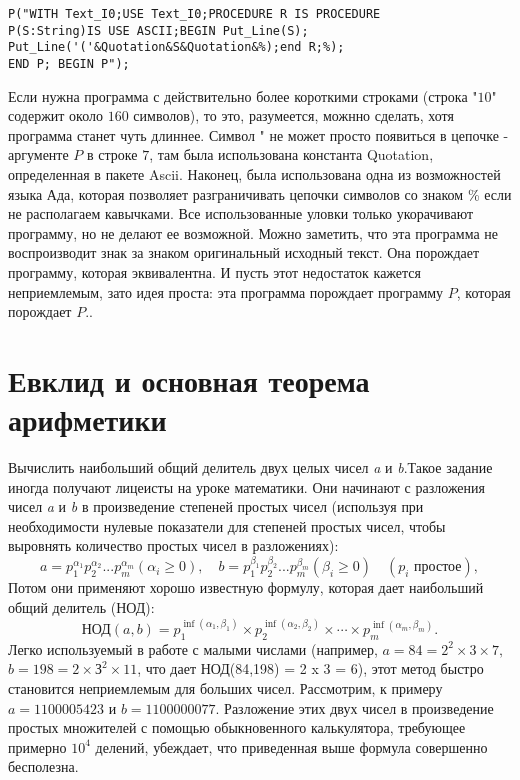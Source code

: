 \begin{lstlisting}[frame=none, mathescape=true, showstringspaces=false]
	P("WITH Text_I0;USE Text_I0;PROCEDURE R IS PROCEDURE
P(S:String)IS USE ASCII;BEGIN Put_Line(S);
Put_Line('('&Quotation&S&Quotation&%);end R;%);
END P; BEGIN P");
\end{lstlisting}

Если нужна программа с действительно более короткими строками \linebreak (строка "$10$" содержит около $160$ символов), то это, разумеется, можнно сделать, хотя программа станет чуть длиннее. Символ " не может просто появиться в цепочке - аргументе $P$ в строке $7$, там была использована константа Quotation, определенная в пакете Ascii. Наконец, была использована одна из возможностей языка Ада, которая позволяет разграничивать цепочки символов со знаком \% если не располагаем кавычками. Все использованные уловки только укорачивают программу, но не делают ее возможной. Можно заметить, что эта программа не воспроизводит знак за знаком оригинальный исходный текст. Она порождает программу, которая эквивалентна. И пусть этот недостаток кажется неприемлемым, зато идея
проста: эта программа порождает программу $P$, которая порождает $P$..
\newpage

\chapter{Евклид и основная теорема арифметики}
\noindent Вычислить наибольший общий делитель двух целых чисел {\it a} и {\it b}.Такое задание иногда получают лицеисты на уроке математики. Они начинают с разложения чисел {\it a} и {\it b} в произведение степеней простых чисел (используя при необходимости нулевые показатели для степеней простых чисел, чтобы выровнять количество простых чисел в разложениях): 
\[
 a=p_1^{\alpha_1}p_2^{\alpha_2}...p_m^{\alpha_m} (\alpha_i \geqslant 0), \quad b=p_1^{\beta_1}p_2^{\beta_2}...p_m^{\beta_m} (\beta_i \geqslant 0) \quad (p_i \text{ простое}),
\]
\noindent Потом они применяют хорошо известную формулу, которая дает наибольший общий делитель (НОД): 
\[
\text{НОД}(a,b)=p_1^{\inf (\alpha_1,\beta_1)} \times p_2^{\inf (\alpha_2,\beta_2)} \times \cdots \times p_m^{\inf (\alpha_m,\beta_m)}.
\]
Легко используемый в работе с малыми числами (например, $a = 84 = 2^2 \times 3 \times 7,$ \linebreak $b = 198 = 2 \times З^2 \times 11$, что дает НОД(84,198) = 2 x 3 = 6), этот метод быстро становится неприемлемым для больших чисел. Рассмотрим, к примеру $a = 1 100 005 423$ и $b = 1 100 000 077$. Разложение этих двух чисел в произведение простых множителей с помощью обыкновенного калькулятора, требующее примерно $10^4$ делений, убеждает, что приведенная выше формула совершенно бесполезна.

